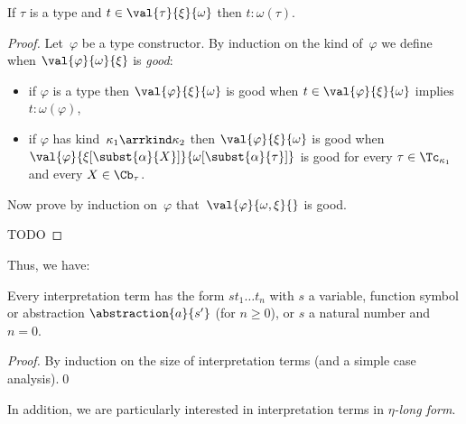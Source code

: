 

\begin{lemma}\label{lem_reducible_type}
  If $\tau$ is a type and $t \in \val{\tau}{\xi}{\omega}$ then
  $t : \omega(\tau)$.
\end{lemma}

\begin{proof}
  Let~$\varphi$ be a type constructor. By induction on the kind
  of~$\varphi$ we define when $\val{\varphi}{\omega}{\xi}$ is
  \emph{good}:
  \begin{itemize}
  \item if $\varphi$ is a type then $\val{\varphi}{\xi}{\omega}$ is
    good when $t \in \val{\varphi}{\xi}{\omega}$ implies
    $t : \omega(\varphi)$,
  \item if $\varphi$ has kind~$\kappa_1\arrkind\kappa_2$ then
    $\val{\varphi}{\xi}{\omega}$ is good when
    $\val{\varphi}{\xi[\subst{\alpha}{X}]}{\omega[\subst{\alpha}{\tau}]}$
    is good for every $\tau \in \Tc_{\kappa_1}$ and every
    $X \in \Cb_\tau$.
  \end{itemize}
  Now prove by induction on~$\varphi$
  that~$\val{\varphi}{\omega,\xi}{}$ is good.

  TODO
\end{proof}

Thus, we have:

\begin{lemma}\label{lem_abusive_notation}
  Every interpretation term has the form $s t_1 \dots t_n$ with $s$ a
  variable, function symbol or abstraction $\abstraction{a}{s'}$ (for
  $n \geq 0$), or $s$ a natural number and $n = 0$.
\end{lemma}

\begin{proof}
By induction on the size of interpretation terms (and a simple case
analysis).\qed
\end{proof}

\newcommand{\arreta}{\rightarrow_\eta}
\newcommand{\etalong}[1]{#1\uparrow^\eta}
\newcommand{\almostetalong}[1]{\overline{#1}}

In addition, we are particularly interested in interpretation terms in
\emph{$\eta$-long form}.

